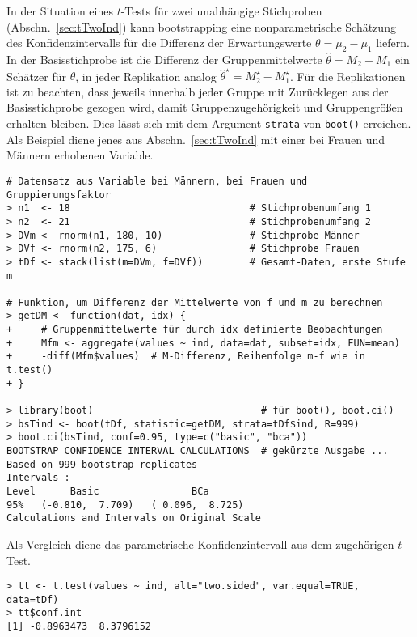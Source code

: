 In der Situation eines $t$-Tests für zwei unabhängige Stichproben (Abschn.\ \ref{sec:tTwoInd}) kann bootstrapping eine nonparametrische Schätzung des Konfidenzintervalls für die Differenz der Erwartungswerte $\theta = \mu_{2}-\mu_{1}$ liefern. In der Basisstichprobe ist die Differenz der Gruppenmittelwerte $\hat{\theta} = M_{2}-M_{1}$ ein Schätzer für $\theta$, in jeder Replikation analog $\hat{\theta}^{\star} = M_{2}^{\star}-M_{1}^{\star}$. Für die Replikationen ist zu beachten, dass jeweils innerhalb jeder Gruppe mit Zurücklegen aus der Basisstichprobe gezogen wird, damit Gruppenzugehörigkeit und Gruppengrößen erhalten bleiben. Dies lässt sich mit dem Argument \lstinline!strata! von \lstinline!boot()! erreichen. Als Beispiel diene jenes aus Abschn.\ \ref{sec:tTwoInd} mit einer bei Frauen und Männern erhobenen Variable.
\begin{lstlisting}
# Datensatz aus Variable bei Männern, bei Frauen und Gruppierungsfaktor
> n1  <- 18                               # Stichprobenumfang 1
> n2  <- 21                               # Stichprobenumfang 2
> DVm <- rnorm(n1, 180, 10)               # Stichprobe Männer
> DVf <- rnorm(n2, 175, 6)                # Stichprobe Frauen
> tDf <- stack(list(m=DVm, f=DVf))        # Gesamt-Daten, erste Stufe m

# Funktion, um Differenz der Mittelwerte von f und m zu berechnen
> getDM <- function(dat, idx) {
+     # Gruppenmittelwerte für durch idx definierte Beobachtungen
+     Mfm <- aggregate(values ~ ind, data=dat, subset=idx, FUN=mean)
+     -diff(Mfm$values)  # M-Differenz, Reihenfolge m-f wie in t.test()
+ }

> library(boot)                             # für boot(), boot.ci()
> bsTind <- boot(tDf, statistic=getDM, strata=tDf$ind, R=999)
> boot.ci(bsTind, conf=0.95, type=c("basic", "bca"))
BOOTSTRAP CONFIDENCE INTERVAL CALCULATIONS  # gekürzte Ausgabe ...
Based on 999 bootstrap replicates
Intervals :
Level      Basic                BCa
95%   (-0.810,  7.709)   ( 0.096,  8.725)
Calculations and Intervals on Original Scale
\end{lstlisting}

Als Vergleich diene das parametrische Konfidenzintervall aus dem zugehörigen $t$-Test.
\begin{lstlisting}
> tt <- t.test(values ~ ind, alt="two.sided", var.equal=TRUE, data=tDf)
> tt$conf.int
[1] -0.8963473  8.3796152
\end{lstlisting}

